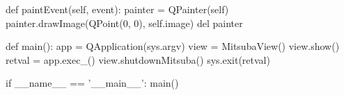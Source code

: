 \begin{python}
    def paintEvent(self, event):
        painter = QPainter(self)
        painter.drawImage(QPoint(0, 0), self.image)
        del painter

def main():
    app = QApplication(sys.argv)
    view = MitsubaView()
    view.show()
    retval = app.exec_()
    view.shutdownMitsuba()
    sys.exit(retval)

if __name__ == '__main__':
    main()
\end{python}
